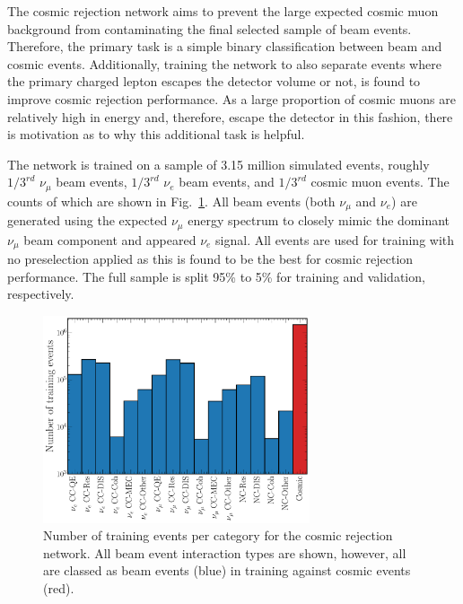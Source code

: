 The cosmic rejection network aims to prevent the large expected cosmic muon background from
contaminating the final selected sample of beam events. Therefore, the primary task is a simple
binary classification between beam and cosmic events. Additionally, training the network to also
separate events where the primary charged lepton escapes the detector volume or not, is found to
improve cosmic rejection performance. As a large proportion of cosmic muons are relatively high in
energy and, therefore, escape the detector in this fashion, there is motivation as to why this
additional task is helpful.

The network is trained on a sample of 3.15 million simulated events, roughly $1/3^{rd}$
$\nu_{\mu}$ beam events, $1/3^{rd}$ $\nu_{e}$ beam events, and $1/3^{rd}$ cosmic muon events. The
counts of which are shown in Fig.~\ref{fig:cosmic_training_sample}. All beam events (both
$\nu_{\mu}$ and $\nu_{e}$) are generated using the expected \chips $\nu_{\mu}$ energy spectrum to
closely mimic the dominant $\nu_{\mu}$ beam component and appeared $\nu_{e}$ signal. All events
are used for training with no preselection applied as this is found to be the best for cosmic
rejection performance. The full sample is split 95\% to 5\% for training and validation,
respectively.

\begin{figure} %
    \includegraphics[width=0.7\textwidth]{diagrams/7-results/explore_cosmic_training_sample.pdf}
    \caption[Number of training events per category for the cosmic rejection network]
    {Number of training events per category for the cosmic rejection network. All beam event
        interaction types are shown, however, all are classed as beam events (blue) in training
        against cosmic events (red).}
    \label{fig:cosmic_training_sample}
\end{figure}

